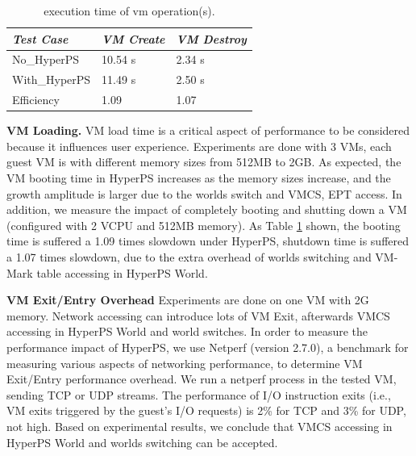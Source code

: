\documentclass[conference]{IEEEtran}
\begin{document}
\begin{table}
\centering
\caption{execution time of vm operation(s).}\label{tabvm}
\begin{tabular}{p{2cm}|p{1.4cm}|p{1.5cm}}
\hline
{\itshape\bfseries  Test Case} & {\itshape\bfseries VM Create} & {\itshape\bfseries VM Destroy} \\
\hline
No\_HyperPS & 10.54 s &  2.34 s\\
\hline
With\_HyperPS & 11.49 s & 2.50 s\\ 
\hline
Efficiency & 1.09 & 1.07 \\
\hline
\end{tabular}
\end{table}


\textbf {VM Loading.}
VM load time is a critical aspect of performance to be considered because it influences user experience.
 Experiments are done with 3 VMs, each guest VM is with different memory sizes from 512MB to 2GB.
 As expected, the VM booting time in HyperPS increases as the memory sizes increase, and the growth amplitude is larger due to the worlds switch and VMCS, EPT access.
In addition, we measure the impact of completely booting and shutting down a VM (configured with 2 VCPU and 512MB memory). As Table \ref{tabvm} shown, the booting time is suffered a 1.09 times slowdown under HyperPS, shutdown time is suffered a 1.07 times slowdown, due to the extra overhead of worlds switching and VM-Mark table accessing in HyperPS World. %


\iffalse
\textbf {VM Exit/Entry Overhead}
Experiments are done on one VM with 2G memory. Network accessing can introduce lots of VM Exit, afterwards VMCS accessing in HyperPS World and world switches. In order to measure the performance impact of HyperPS, we use Netperf (version 2.7.0), a benchmark for measuring various aspects of networking performance, to determine VM Exit/Entry performance overhead. We run a netperf process in the tested VM, sending TCP or UDP streams. The performance of I/O instruction exits (i.e., VM exits triggered by the guest's I/O requests) is 2\% for TCP and 3\% for UDP, not high. 
Based on experimental results, we conclude that VMCS accessing in HyperPS World and worlds switching can be accepted.
\end{document}
